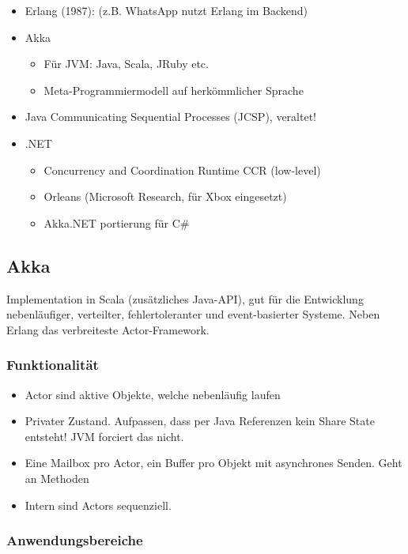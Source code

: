 \begin{itemize}
	\item Erlang (1987): (z.B. WhatsApp nutzt Erlang im Backend)
	\item Akka \begin{itemize}
		\item Für JVM: Java, Scala, JRuby etc.
		\item Meta-Programmiermodell auf herkömmlicher Sprache
	\end{itemize}
	\item Java Communicating Sequential Processes (JCSP), veraltet!
	\item .NET \begin{itemize}
		\item Concurrency and Coordination Runtime CCR (low-level)
		\item Orleans (Microsoft Research, für Xbox eingesetzt)
		\item Akka.NET portierung für C\#
	\end{itemize}
\end{itemize}

\subsection{Akka}

Implementation in Scala (zusätzliches Java-API), gut für die Entwicklung nebenläufiger, verteilter, fehlertoleranter und event-basierter Systeme. Neben Erlang das verbreiteste Actor-Framework.

\subsubsection{Funktionalität}

\begin{itemize}
	\item Actor sind aktive Objekte, welche nebenläufig laufen
	\item Privater Zustand. Aufpassen, dass per Java Referenzen kein Share State entsteht! JVM forciert das nicht.
	\item Eine Mailbox pro Actor, ein Buffer pro Objekt mit asynchrones Senden. Geht an Methoden
	\item Intern sind Actors sequenziell.
\end{itemize}

\subsubsection{Anwendungsbereiche}

